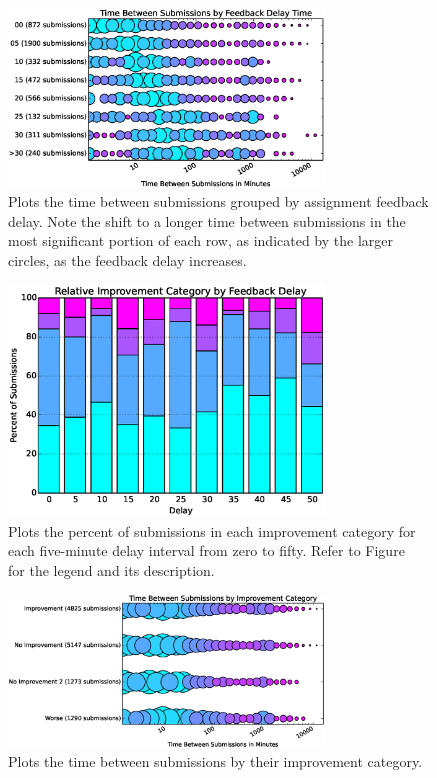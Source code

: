 \begin{figure}[!t]
\centering
\includegraphics[width=3.3in]{graphs/Time_Between_Submissions_by_Feedback_Delay_Time.eps}
\caption{Plots the time between submissions grouped by assignment feedback
  delay. Note the shift to a longer time between submissions in the most
  significant portion of each row, as indicated by the larger circles, as the
  feedback delay increases.}
\end{figure}

\begin{figure}[!t]
\centering
\includegraphics[width=3.3in]{graphs/Relative_Improvement_Category_by_Feedback_Delay.eps}
\caption{Plots the percent of submissions in each improvement category for each
  five-minute delay interval from zero to fifty. Refer to
  Figure~ for the legend and its description.}
\end{figure}

\begin{figure}[!t]
\centering \includegraphics[width=3.3in]{graphs/Time_Between_Submissions_by_Improvement_Category.eps}
\caption{Plots the time between submissions by their improvement category.}
\end{figure}

